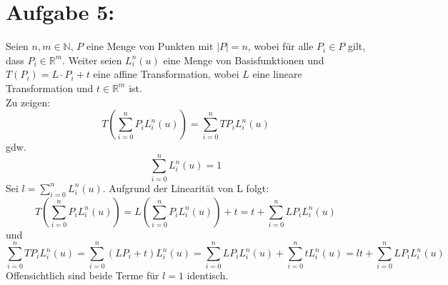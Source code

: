 \section*{Aufgabe 5: }
Seien $n, m \in \mathbb{N}$, $P$ eine Menge von Punkten mit $|P| = n$, wobei für alle $P_i \in P$ gilt, dass $P_i \in \mathbb{R}^m$.
Weiter seien $L_i^n(u)$ eine Menge von Basisfunktionen und $T(P_i) = L \cdot P_i + t$ eine affine Transformation, wobei $L$ eine lineare Transformation und $t \in \mathbb{R}^m$ ist.\\
Zu zeigen:
$$
T\left(\sum_{i=0}^{n}P_iL_i^n(u)\right) = \sum_{i=0}^{n}TP_iL_i^n(u)
$$
gdw.
$$
\sum_{i=0}^{n}L_i^n(u) = 1 
$$
Sei $l = \sum_{i=0}^{n}L_i^n(u)$. Aufgrund der Linearität von L folgt:
$$
T\left(\sum_{i=0}^{n}P_iL_i^n(u)\right) = L\left(\sum_{i=0}^{n}P_iL_i^n(u)\right) + t = t + \sum_{i=0}^{n}LP_iL_i^n(u)
$$
und
$$
\sum_{i=0}^{n}TP_iL_i^n(u) = \sum_{i=0}^{n}(LP_i + t)L_i^n(u) = \sum_{i=0}^{n}LP_iL_i^n(u) + \sum_{i=0}^{n}tL_i^n(u) = lt + \sum_{i=0}^{n}LP_iL_i^n(u)
$$
Offensichtlich sind beide Terme für $l = 1$ identisch.